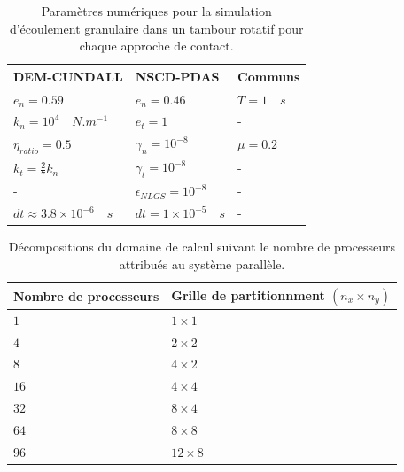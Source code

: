 \vspace{-1cm}

\begin{center}
\begin{table}[!h]
\begin{tabular}{ |p{5cm}|p{3.8cm}|p{3.4cm}| }
 \hline \rowcolor{lightgray}
 DEM-CUNDALL& NSCD-PDAS& Communs\\
 \hline
 $e_n = 0.59$ & $e_n = 0.46$ & $T = 1 \quad s$\\
 $k_n = 10^4 \quad N.m^{-1}$& $e_t = 1$ & -\\
 $\eta_{ratio} = 0.5$ & $\gamma_n = 10^{-8}$ & $\mu = 0.2$\\
 $k_t = \frac{2}{7} k_n$ & $\gamma_t = 10^{-8}$ & -\\
 - & $\epsilon_{NLGS} =  10^{-8}$ & -\\
 $dt \approx 3.8\times10^{-6} \quad s$ &$dt = 1\times10^{-5} \quad s$ &-\\
 \hline
\end{tabular}
\caption{Paramètres numériques pour la simulation d'écoulement granulaire dans un tambour rotatif pour chaque approche de contact.}\label{tab_48}
\end{table}
\end{center}

\vspace{-1.5cm}

\begin{center}
\begin{table}[!h]
\begin{tabular}{ |p{6.5cm}|p{6.1cm}| }
 \hline \rowcolor{lightgray}
 Nombre de processeurs& Grille de partitionnment $(n_x\times n_y)$\\
 \hline
 $1$ & $1\times1$\\
 $4$& $2\times2$\\
 $8$ & $4\times2$\\
 $16$ & $4\times4$\\
 $32$ & $8\times4$\\
 $64$ & $8\times8$\\
 $96$ & $12\times8$\\
 \hline
\end{tabular}
\caption{Décompositions du domaine de calcul suivant le nombre de processeurs attribués au système parallèle.}\label{tab_49}
\end{table}
\end{center}

\vspace{-1cm}

